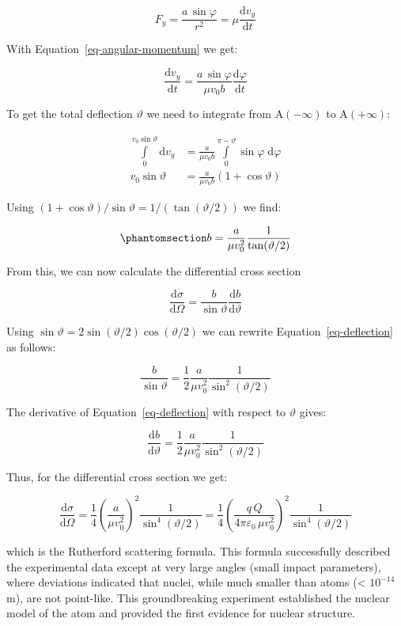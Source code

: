 \documentclass[
  a4paper,
]{book}
\begin{document}
\begin{tcolorbox}
\[
F_y = \frac{a\,\sin\varphi}{r^2} = \mu \frac{\mathrm d v_y}{\mathrm d t}
\]

With Equation~\ref{eq-angular-momentum} we get:

\[
\frac{\mathrm d v_y}{\mathrm d t} = \frac{a\,\sin\varphi}{\mu v_0 b} \frac{\mathrm d\varphi}{\mathrm d t}
\]

To get the total deflection \(\vartheta\) we need to integrate from
\(\mathrm A(-\infty)\) to \(\mathrm A(+\infty)\):

\[
\begin{aligned}
\int\limits_{0}^{v_0 \sin\vartheta} \mathrm d v_y &=
    \frac{a}{\mu v_0 b} \int\limits_{0}^{\pi - \vartheta} \sin \varphi \; \mathrm d\varphi\\
v_0 \sin \vartheta &= \frac{a}{\mu v_0 b} \left(1 + \cos\vartheta \right)
\end{aligned}
\]

Using \((1 + \cos\vartheta) / \sin\vartheta = 1/(\tan(\vartheta/2))\) we
find:

\begin{equation}\phantomsection\label{eq-deflection}{
b = \frac{a}{\mu v_0^2} \frac{1}{\tan(\vartheta/2)}
}\end{equation}

From this, we can now calculate the differential cross section

\[
\frac{\mathrm d\sigma}{\mathrm d\Omega} = \frac{b}{\sin\vartheta}\frac{\mathrm db}{\mathrm d\vartheta}
\]

Using \(\sin\vartheta=2\sin(\vartheta/2)\cos(\vartheta/2)\) we can
rewrite Equation~\ref{eq-deflection} as follows:

\[
\frac{b}{\sin\vartheta} = \frac{1}{2}\frac{a}{\mu v_0^2}\frac{1}{\sin^2(\vartheta/2)}
\]

The derivative of Equation~\ref{eq-deflection} with respect to
\(\vartheta\) gives:

\[
\frac{\mathrm db}{\mathrm d\vartheta} = \frac{1}{2}\frac{a}{\mu v_0^2}\frac{1}{\sin^2(\vartheta/2)}
\]

Thus, for the differential cross section we get:

\[
\frac{\mathrm d\sigma}{\mathrm d\Omega} = \frac{1}{4}\left(\frac{a}{\mu v_0^2}\right)^2\frac{1}{\sin^4(\vartheta/2)} = \frac{1}{4}\left(\frac{q\,Q}{4\pi\varepsilon_0\,\mu v_0^2}\right)^2\frac{1}{\sin^4(\vartheta/2)}
\]

which is the Rutherford scattering formula. This formula successfully
described the experimental data except at very large angles (small
impact parameters), where deviations indicated that nuclei, while much
smaller than atoms (\textless{} \(10^{-14}\) m), are not point-like.
This groundbreaking experiment established the nuclear model of the atom
and provided the first evidence for nuclear structure.

\end{tcolorbox}
\end{document}
